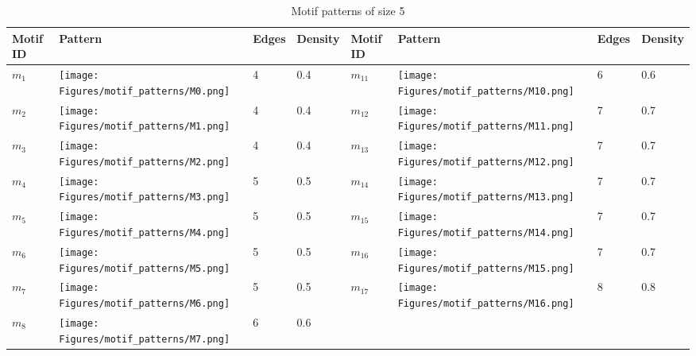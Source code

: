 \documentclass[smallextended]{svjour3}       %
\theoremstyle{definition}
\begin{document}
\begin{table}[t!]
	\centering
	\caption{Motif patterns of size 5} \label{tab:motif_patterns}
	\begin{tabular}{|p{1.2cm}|p{2cm}|p{0.8cm}|p{1.2cm}|p{1.2cm}|p{2cm}|p{0.8cm}|p{1.2cm}|}
		\hline \textbf{Motif ID} & \textbf{Pattern} & \textbf{Edges} & \textbf{Density} & \textbf{Motif ID} & \textbf{Pattern} & \textbf{Edges} & \textbf{Density}\\
		\hline $m_1$ & \parbox[c]{1em}{
			\texttt{[image: Figures/motif\_patterns/M0.png]}} & 4 & 0.4 
		& $m_{11}$ & \parbox[c]{1em}{
			\texttt{[image: Figures/motif\_patterns/M10.png]}} & 6 & 0.6
		\\
		\hline
		\hline $m_2$ & \parbox[c]{1em}{
			\texttt{[image: Figures/motif\_patterns/M1.png]}} & 4 & 0.4 
		& $m_{12}$ & \parbox[c]{1em}{
			\texttt{[image: Figures/motif\_patterns/M11.png]}} & 7 & 0.7
		\\
		\hline
		\hline $m_3$ & \parbox[c]{1em}{
			\texttt{[image: Figures/motif\_patterns/M2.png]}} & 4 & 0.4 
		& $m_{13}$ & \parbox[c]{1em}{
			\texttt{[image: Figures/motif\_patterns/M12.png]}} & 7 & 0.7
		\\
		\hline
		\hline $m_4$ & \parbox[c]{1em}{
			\texttt{[image: Figures/motif\_patterns/M3.png]}} & 5 & 0.5 
		& $m_{14}$ & \parbox[c]{1em}{
			\texttt{[image: Figures/motif\_patterns/M13.png]}} & 7 & 0.7
		\\
		\hline
		\hline $m_5$ & \parbox[c]{1em}{
			\texttt{[image: Figures/motif\_patterns/M4.png]}} & 5 & 0.5 
		& $m_{15}$ & \parbox[c]{1em}{
			\texttt{[image: Figures/motif\_patterns/M14.png]}} & 7 & 0.7
		\\
		\hline
		\hline $m_6$ & \parbox[c]{1em}{
			\texttt{[image: Figures/motif\_patterns/M5.png]}} & 5 & 0.5 
		& $m_{16}$ & \parbox[c]{1em}{
			\texttt{[image: Figures/motif\_patterns/M15.png]}} & 7 & 0.7
		\\
		\hline
		\hline $m_7$ & \parbox[c]{1em}{
			\texttt{[image: Figures/motif\_patterns/M6.png]}} & 5 & 0.5 
		& $m_{17}$ & \parbox[c]{1em}{
			\texttt{[image: Figures/motif\_patterns/M16.png]}} & 8 & 0.8
		\\
		\hline
		\hline $m_8$ & \parbox[c]{1em}{
			\texttt{[image: Figures/motif\_patterns/M7.png]}} & 6 & 0.6 

\end{tabular}
\end{table}
\end{document}
